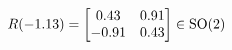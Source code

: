 \documentclass[preview]{standalone}
\begin{document}
\begin{align*}
\special{dvisvgm:raw <g id='unique000'>}R(-1.13) = \begin{bmatrix} 0.43 & 0.91 \\ -0.91 & 0.43 \end{bmatrix} \in \text{SO}(2)\special{dvisvgm:raw </g>}
\end{align*}
\end{document}
